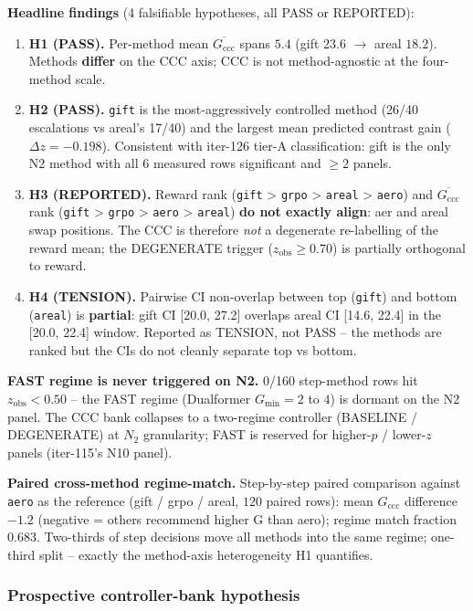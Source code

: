 \textbf{Headline findings}
(4 falsifiable hypotheses, all PASS or REPORTED):

\begin{enumerate}
\item \textbf{H1 (PASS).}  Per-method mean $\overline{G_{\mathrm{ccc}}}$
spans $5.4$ (gift $23.6$ $\to$ areal $18.2$).  Methods
\textbf{differ} on the CCC axis; CCC is not method-agnostic at the
four-method scale.
\item \textbf{H2 (PASS).}  \texttt{gift} is the most-aggressively
controlled method (26/40 escalations vs areal's 17/40) and the
largest mean predicted contrast gain ($\Delta z = -0.198$).  Consistent
with iter-126 tier-A classification: gift is the only N2 method with
all 6 measured rows significant and $\geq 2$ panels.
\item \textbf{H3 (REPORTED).}  Reward rank (\texttt{gift} > \texttt{grpo}
> \texttt{areal} > \texttt{aero}) and $\overline{G_{\mathrm{ccc}}}$ rank
(\texttt{gift} > \texttt{grpo} > \texttt{aero} > \texttt{areal})
\textbf{do not exactly align}: aer and areal swap positions.  The CCC
is therefore \emph{not} a degenerate re-labelling of the reward mean;
the DEGENERATE trigger ($z_{\mathrm{obs}}\geq 0.70$) is partially
orthogonal to reward.
\item \textbf{H4 (TENSION).}  Pairwise CI non-overlap between top
(\texttt{gift}) and bottom (\texttt{areal}) is
\textbf{partial}: gift CI [20.0, 27.2] overlaps areal CI [14.6, 22.4]
in the [20.0, 22.4] window.  Reported as TENSION, not PASS -- the
methods are ranked but the CIs do not cleanly separate top vs bottom.
\end{enumerate}

\textbf{FAST regime is never triggered on N2.}  0/160 step-method rows
hit $z_{\mathrm{obs}}<0.50$ -- the FAST regime (Dualformer
$G_{\min}{=}2$ to $4$) is dormant on the N2 panel.  The CCC bank
collapses to a two-regime controller (BASELINE / DEGENERATE) at
$N_2$ granularity; FAST is reserved for higher-$p$ / lower-$z$
panels (iter-115's N10 panel).

\textbf{Paired cross-method regime-match.}  Step-by-step paired
comparison against \texttt{aero} as the reference (gift / grpo /
areal, $120$ paired rows): mean $G_{\mathrm{ccc}}$ difference
$-1.2$ (negative = others recommend higher G than aero); regime
match fraction 0.683.  Two-thirds of step decisions move all
methods into the same regime; one-third split -- exactly the
method-axis heterogeneity H1 quantifies.

\subsubsection*{Prospective controller-bank hypothesis}

